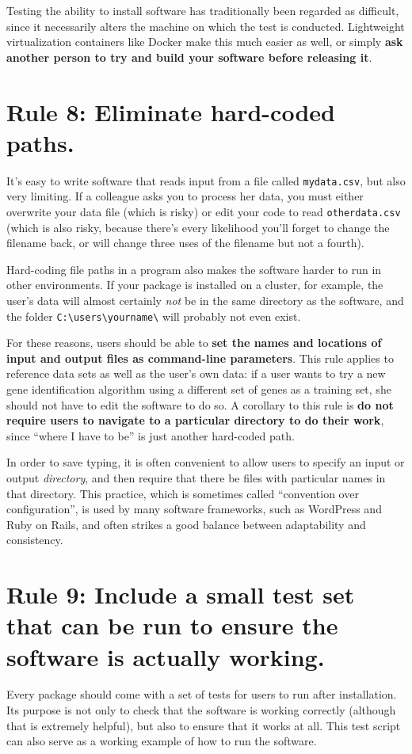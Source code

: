 \documentclass[10pt,letterpaper]{article}
\newcommand{\rulemajor}[1]{\section{#1}}
\newcommand{\ruleminor}[1]{\textbf{#1}}
\begin{document}
Testing the ability to install software has traditionally been regarded as difficult,
since it necessarily alters the machine on which the test is conducted.
Lightweight virtualization containers like Docker make this much easier as well,
or simply \ruleminor{ask another person to try and build your software before releasing it}.

\rulemajor{Rule 8: Eliminate hard-coded paths.}

It's easy to write software that reads input from a file called
\texttt{mydata.csv}, but also very limiting. If a colleague asks you to
process her data, you must either overwrite your data file (which is
risky) or edit your code to read \texttt{otherdata.csv} (which is also
risky, because there's every likelihood you'll forget to change the
filename back, or will change three uses of the filename but not a
fourth).

Hard-coding file paths in a program also makes the software harder to run
in other environments. If your package is installed on a cluster, for
example, the user's data will almost certainly \emph{not} be in the same
directory as the software, and the folder
\texttt{C:\textbackslash{}users\textbackslash{}yourname\textbackslash{}}
will probably not even exist.

For these reasons, users should be able to
\ruleminor{set the names and locations of input and output files as command-line parameters}.
This rule applies to reference data sets as well as the user's own
data: if a user wants to try a new gene identification algorithm using
a different set of genes as a training set, she should not have to
edit the software to do so.
A corollary to this rule is
\ruleminor{do not require users to navigate to a particular directory to do their work},
since ``where I have to be'' is just another hard-coded path.

In order to save typing, it is often convenient to allow users to
specify an input or output \emph{directory}, and then require that there
be files with particular names in that directory. This practice, which
is sometimes called ``convention over configuration'', is used by many
software frameworks, such as WordPress and Ruby on Rails, and often
strikes a good balance between adaptability and consistency.

\rulemajor{Rule 9: Include a small test set that can be run to ensure the software is actually working.}

Every package should come with a set of tests for users to run
after installation. Its purpose is not only to check that the software
is working correctly (although that is extremely helpful), but also to
ensure that it works at all. This test script can also serve as a
working example of how to run the software.
\end{document}
